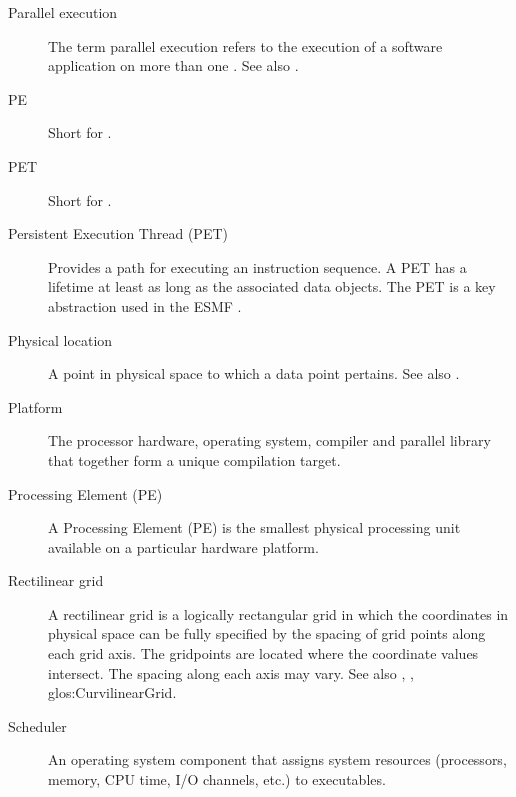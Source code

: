 \begin{description}
\label{glos:Parallel}
\item[Parallel execution]
  The term parallel execution refers to the execution of a software
  application on more than one .
  See also .

\label{glos:PE} 
\item[PE] 
  Short for .

\label{glos:PET} 
\item[PET] 
  Short for .

\label{glos:PermET} 
\item[Persistent Execution Thread (PET)] 
  Provides a
  path for executing an instruction sequence. A PET has a lifetime at least 
  as long as the associated data objects. The PET is a key abstraction 
  used in the ESMF .

\label{glos:PhysLoc} 
\item[Physical location] 
  A point in physical space to which a data point pertains.  See also
  .   

\label{glos:Platform} 
\item[Platform] 
  The processor hardware, operating system, compiler and
  parallel library that together form a unique compilation target.

\label{glos:Processing_Element}
\item[Processing Element (PE)] 
  A Processing Element (PE) is the smallest physical processing unit available
  on a particular hardware platform.

\label{glos:RectilinearGrid}
\item[Rectilinear grid]
  A rectilinear grid is a logically rectangular grid in which 
  the coordinates in physical space can be fully specified by
  the spacing of grid points along each grid axis.  The
  gridpoints are located where the coordinate values intersect.
  The spacing along each axis may vary.  
  See also ,
  , 
  {glos:CurvilinearGrid}.  

\label{glos:Scheduler} 
\item[Scheduler] 
  An operating system component 
  that assigns system resources (processors, memory, CPU time, 
  I/O channels, etc.) to executables.


\end{description}

